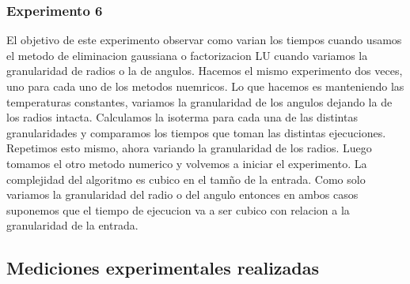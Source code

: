   	\subsubsection*{Experimento 6}
  		El objetivo de este experimento observar como varian los tiempos cuando usamos el metodo de eliminacion gaussiana o factorizacion LU cuando variamos la granularidad de radios o la de angulos.
  		Hacemos el mismo experimento dos veces, uno para cada uno de los metodos nuemricos. Lo que hacemos es manteniendo las temperaturas constantes, variamos la granularidad de los angulos dejando la de los radios intacta. Calculamos la isoterma para cada una de las distintas granularidades y comparamos los tiempos que toman las distintas ejecuciones. Repetimos esto mismo, ahora variando la granularidad de los radios. Luego tomamos el otro metodo numerico y volvemos a iniciar el experimento. 
  		La complejidad del algoritmo es cubico en el tamño de la entrada. Como solo variamos la granularidad del radio o del angulo entonces en ambos casos suponemos que el tiempo de ejecucion va a ser cubico con relacion a la granularidad de la entrada.


  \subsection{Mediciones experimentales realizadas}
